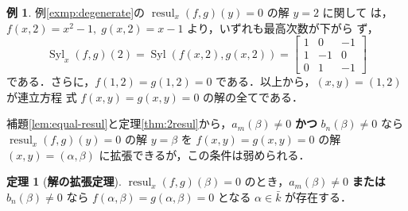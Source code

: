 \documentclass[12pt, uplatex, dvipdfmx]{jsarticle}
\theoremstyle{definition}
\newtheorem{theorem}{定理}
\newtheorem{example}{例}
\DeclareMathOperator{\Syl}{Syl}
\DeclareMathOperator{\resul}{resul}
\begin{document}
\begin{example}
  例\ref{exmp:degenerate}の $\resul_x(f,g)(y)=0$ の解 $y=2$ に関して
  は，$f(x,2)=x^2-1, \; g(x,2)=x-1$ より，いずれも最高次数が下がら
  ず，
  \[
    \Syl_x(f,g)(2)= \Syl(f(x,2), g(x,2))=\left[
      \begin{array}{rrr}
        1 & 0 & -1\\
        1 & -1 & 0\\
        0 & 1 & -1
      \end{array}
    \right]
  \]
  である．さらに，$f(1,2)=g(1,2)=0$ である．以上から，$(x,y)=(1,2)$ が連立方程
  式 $f(x,y)=g(x,y)=0$ の解の全てである．
\end{example}

補題\ref{lem:equal-resul}と定理\ref{thm:2resul}から，$a_m(\beta)\neq
0$ \textbf{かつ} $b_n(\beta) \neq 0$ なら $\resul_x(f,g)(y)=0$ の解 $y=\beta$ を $f(x,y)=g(x,y)=0$ の解
$(x,y)=(\alpha,\beta)$ に拡張できるが，この条件は弱められる．

\begin{theorem}[\textbf{解の拡張定理}]\label{thm:extention}
  $\resul_x(f,g)(\beta)=0$ のとき，$a_m(\beta) \neq 0$ \textbf{または} $b_n(\beta) \neq 0$ なら $f(\alpha,
  \beta)=g(\alpha,\beta)=0$ となる $\alpha \in \bar{k}$ が存在する．
\end{theorem}
\end{document}
